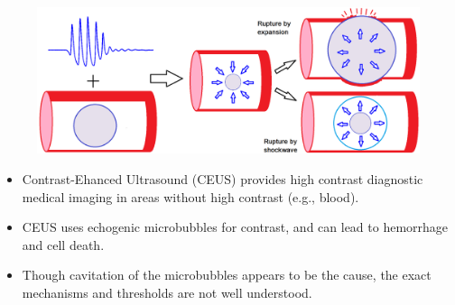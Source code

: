 \begin{frame}
\begin{figure}
\hfill%
    \includegraphics[height=0.25\textheight]{./figs/cavitation_hemorrhage}
  \end{figure}
  {\small
    \begin{itemize}
    \item Contrast-Ehanced Ultrasound (CEUS) provides high contrast diagnostic medical imaging in areas without high contrast (e.g., blood).
    \item CEUS uses echogenic microbubbles for contrast, and can lead to hemorrhage and cell death.
    \item Though cavitation of the microbubbles appears to be the
      cause, the exact mechanisms and thresholds are not well
      understood.
    \end{itemize}
  }
\end{frame}
%
